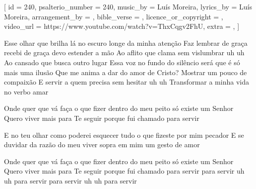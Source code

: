
[
    id                     = {240},
    psalterio_number       = {240},
    music_by               = {Luís Moreira},
    lyrics_by              = {Luís Moreira},
    arrangement_by         = {},
    bible_verse            = {},
    licence_or_copyright   = {},
    video_url              = {https://www.youtube.com/watch?v=ThxCqgv2FhU},
    extra                  = {},
]

\beginverse
Esse olhar que brilha lá no escuro
longe da minha atenção
Faz lembrar de graça recebi
de graça devo estender a mão
Ao aflito que clama sem vislumbrar uh uh
Ao cansado que busca outro lugar
Essa voz no fundo do silêncio
será que é só mais uma ilusão
Que me anima a dar do amor de Cristo?
Mostrar um pouco de compaixão
E servir a quem precisa
sem hesitar uh uh
Transformar a minha vida no verbo amar

\beginchorus
Onde quer que vá
faça o que fizer
dentro do meu peito
só existe um Senhor
Quero viver mais
para Te seguir
porque fui chamado para servir
\endchorus

\beginverse
E no teu olhar
como poderei esquecer
tudo o que fizeste por mim pecador
E se duvidar da razão do meu viver
sopra em mim um gesto de amor
\endverse

\beginchorus
Onde quer que vá
faça o que fizer
dentro do meu peito
só existe um Senhor
Quero viver mais
para Te seguir
porque fui chamado para servir
para servir uh uh
para servir
para servir uh uh
para servir
\endchorus

\endsong
